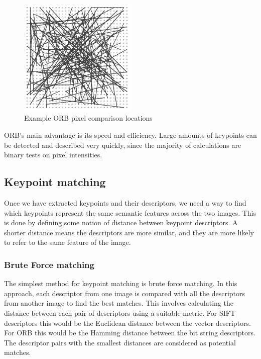\begin{figure}[ht]
    \centering
    \includegraphics[width=0.5\textwidth]{figures/ORB.png}
    \caption{Example ORB pixel comparison locations \cite{BRIEF}}
    \label{fig:ORB}
\end{figure}

ORB's main advantage is its speed and efficiency. Large amounts of keypoints can be detected and described very quickly, since the majority of calculations are binary tests on pixel intensities.

\subsection{Keypoint matching}
Once we have extracted keypoints and their descriptors, we need a way to find which keypoints represent the same semantic features across the two images. This is done by defining some notion of distance between keypoint descriptors. A shorter distance means the descriptors are more similar, and they are more likely to refer to the same feature of the image.

\subsubsection{Brute Force matching}
The simplest method for keypoint matching is brute force matching. In this approach, each descriptor from one image is compared with all the descriptors from another image to find the best matches. This involves calculating the distance between each pair of descriptors using a suitable metric. For SIFT descriptors this would be the Euclidean distance between the vector descriptors. For ORB this would be the Hamming distance between the bit string descriptors. The descriptor pairs with the smallest distances are considered as potential matches.\\

